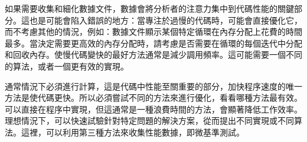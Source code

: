 如果需要收集和細化數據文件，數據會將分析者的注意力集中到代碼性能的關鍵部分。這也是可能會陷入錯誤的地方：當專注於過慢的代碼時，可能會直接優化它，而不考慮其他的情況，例如：數據文件顯示某個特定循環在內存分配上花費的時間最多。當決定需要更高效的內存分配時，請考慮是否需要在循環的每個迭代中分配和回收內存。使慢代碼變快的最好方法通常是減少調用頻率。這可能需要一個不同的算法，或者一個更有效的實現。

通常情況下必須進行計算，這是代碼中性能至關重要的部分，加快程序速度的唯一方法是使代碼更快。所以必須嘗試不同的方法來進行優化，看看哪種方法最有效。可以直接在程序中實現，但這通常是一種浪費時間的方法，會顯著降低工作效率。理想情況下，可以快速試驗針對特定問題的解決方案，從而提出不同實現或不同算法。這裡，可以利用第三種方法來收集性能數據，即微基準測試。













